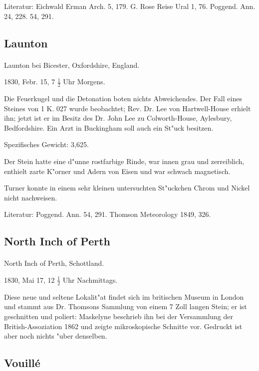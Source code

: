 \documentclass[a4paper, 11pt, oneside]{article}
\begin{document}
\footnotesize
Literatur: Eichwald Erman Arch. 5, 179. G. Rose Reise Ural 1, 76. Poggend. Ann. 24, 228. 54, 291.

\subsection{Launton}
\normalsize
\paragraph{}
Launton bei Bicester, Oxfordshire, England.

1830, Febr. 15, 7 $\frac{1}{2}$ Uhr Morgens.

Die Feuerkugel und die Detonation boten nichts Abweichendes. Der Fall eines Steines von 1 K. 027 wurde beobachtet; Rev. Dr. Lee von Hartwell-House erhielt ihn; jetzt ist er im Besitz des Dr. John Lee zu Colworth-House, Aylesbury, Bedfordshire. Ein Arzt in Buckingham soll auch ein St"uck besitzen.

Spezifisches Gewicht: 3,625.

Der Stein hatte eine d"unne rostfarbige Rinde, war innen grau und zerreiblich, enthielt zarte K"orner und Adern von Eisen und war schwach magnetisch.

Turner konnte in einem sehr kleinen untersuchten St"uckchen Chrom und Nickel nicht nachweisen.

\footnotesize
Literatur: Poggend. Ann. 54, 291. Thomson Meteorology 1849, 326.

\subsection{North Inch of Perth}
\normalsize
\paragraph{}
North Inch of Perth, Schottland.

1830, Mai 17, 12 $\frac{1}{2}$ Uhr Nachmittags.

Diese neue und seltene Lokalit"at findet sich im britischen Museum in London und stammt aus Dr. Thomsons Sammlung von einem 7 Zoll langen Stein; er ist geschnitten und poliert: Maskelyne beschrieb ihn bei der Versammlung der British-Assoziation 1862 und zeigte mikroskopische Schnitte vor. Gedruckt ist aber noch nichts "uber denselben.

\subsection{Vouillé}
\normalsize
\end{document}
